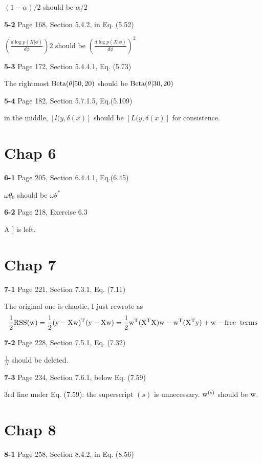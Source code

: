 \documentclass[aps,preprint,a4]{revtex4-1}
\newcommand{\nl}{\nonumber \\}
\begin{document}
$(1-\alpha)/2$ should be $\alpha/2$

{\color{red}\textbf{5-2}} Page 168, Section 5.4.2, in Eq. (5.52)

$\left(\frac{d\log p(X|\phi)}{d\phi}\right)2$ should be
$\left(\frac{d\log p(X|\phi)}{d\phi}\right)^{2}$ 

{\color{red}\textbf{5-3}} Page 172, Section 5.4.4.1, Eq. (5.73)

The rightmost $\rm Beta(\theta|50,20)$ should be
$\rm Beta(\theta|30,20)$

{\color{red}\textbf{5-4}} Page 182, Section 5.7.1.5, Eq.(5.109)

in the middle, $[l(y,\delta(x)]$ should be $[L(y,\delta(x)]$ for consistence.


\section{Chap 6}
{\color{red}\textbf{6-1}} Page 205, Section 6.4.4.1, Eq.(6.45)

$\omega\theta_{0}$ should be $\omega\theta^{*}$

{\color{red}\textbf{6-2}} Page 218, Exercise 6.3

A $]$ is left.


\section{Chap 7}
{\color{red}\textbf{7-1}} Page 221, Section 7.3.1, Eq. (7.11)

The original one is chaotic, I just rewrote as
\begin{equation}
\frac{1}{2} \rm RSS(w) = \frac{1}{2}(y-Xw)^{T}(y-Xw) = \frac{1}{2}w^{T}(X^{T}X)w
-w^{T}(X^{T}y) + \rm{w-free \;\; terms}\nl
\end{equation}

{\color{red}\textbf{7-2}} Page 228, Section 7.5.1, Eq. (7.32)

$\frac{1}{N}$ should be deleted.

{\color{red}\textbf{7-3}} Page 234, Section 7.6.1, below Eq. (7.59)

3rd line under Eq. (7.59): the superscript $(s)$ is unnecessary. $\rm w^{(s)}$ should
be $\rm w$.


\section{Chap 8}
{\color{red}\textbf{8-1}} Page 258, Section 8.4.2, in Eq. (8.56)
\end{document}
